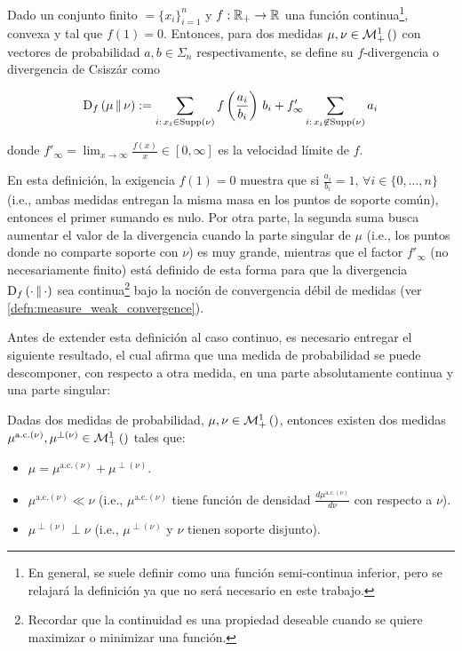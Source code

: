 \begin{defn}
	\label{defn:f_div_discrete}
	Dado un conjunto finito $\xspace=\{x_i\}_{i=1}^n$ y $f:\mathbb{R}_+\to\mathbb{R}$ una función continua\footnote{En general, se suele definir como una función semi-continua inferior, pero se relajará la definición ya que no será necesario en este trabajo.}, convexa y tal que $f(1)=0$. Entonces, para dos medidas $\mu,\nu\in\mathcal{M}_+^1\left(\right)$ con vectores de probabilidad $a,b\in\Sigma_n$ respectivamente, se define su $f$-divergencia o divergencia de Csiszár como

	\begin{equation*}
		\operatorname{D}_f\left(\mu\,\|\,\nu\right)
		:= \sum_{i:\, x_i\in\operatorname{Supp}\left(\nu\right)} f\left(\frac{a_i}{b_i}\right)\, b_i + f'_\infty\sum_{i:\, x_i\not\in\operatorname{Supp}\left(\nu\right)} a_i
	\end{equation*}

	donde $f'_\infty = \lim_{x\to\infty} \frac{f(x)}{x}\in[0,\infty]$ es la velocidad límite de $f$.
\end{defn}

En esta definición, la exigencia $f(1)=0$ muestra que si $\frac{a_i}{b_i} = 1,\,\forall i\in\{0,\ldots,n\}$ (i.e., ambas medidas entregan la misma masa en los puntos de soporte común), entonces el primer sumando es nulo. Por otra parte, la segunda suma busca aumentar el valor de la divergencia cuando la parte singular de $\mu$ (i.e., los puntos donde no comparte soporte con $\nu$) es muy grande, mientras que el factor $f'_\infty$ (no necesariamente finito) está definido de esta forma para que la divergencia $\operatorname{D}_f\left(\cdot\,\|\,\cdot\right)$ sea continua\footnote{Recordar que la continuidad es una propiedad deseable cuando se quiere maximizar o minimizar una función.} bajo la noción de convergencia débil de medidas (ver \autoref{defn:measure_weak_convergence}).

Antes de extender esta definición al caso continuo, es necesario entregar el siguiente resultado, el cual afirma que una medida de probabilidad se puede descomponer, con respecto a otra medida, en una parte absolutamente continua y una parte singular:

\begin{teo}
	Dadas dos medidas de probabilidad, $\mu,\nu\in\mathcal{M}_+^1\left(\right)$, entonces existen dos medidas $\mu^{\text{a.c.}(\nu)},\mu^{\perp(\nu)}\in\mathcal{M}_+^1\left(\right)$ tales que:

	\begin{itemize}
		\item $\mu = \mu^{\text{a.c.}(\nu)} + \mu^{\perp(\nu)}$.
		\item $\mu^{\text{a.c.}(\nu)} \ll \nu$ (i.e., $\mu^{\text{a.c.}(\nu)}$ tiene función de densidad $\frac{d\mu^{\text{a.c.}(\nu)}}{d\nu}$ con respecto a $\nu$).
		\item $\mu^{\perp(\nu)} \perp \nu$ (i.e., $\mu^{\perp(\nu)}$ y $\nu$ tienen soporte disjunto).
	\end{itemize}
\end{teo}

